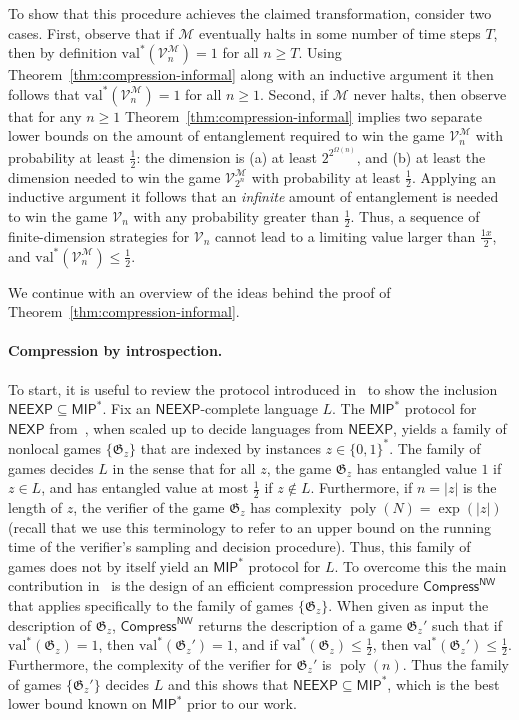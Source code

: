 \documentclass[11pt]{article}
\theoremstyle{definition}
\DeclareMathOperator{\poly}{poly}
\newcommand{\val}{\ensuremath{\mathrm{val}}}
\newcommand{\game}{\mathfrak{G}}
\newcommand{\verifier}{\mathcal{V}}
\newcommand{\class}[1]{\ensuremath{\mathsf{#1}}\xspace}
\newcommand{\NEXP}{\class{NEXP}} %
\newcommand{\MIP}{\class{MIP}} %
\newcommand{\NEEXP}{\class{NEEXP}} %
\newcommand{\machine}{\cal{M}}
\renewcommand{\cal}[1]{\mathcal{#1}}
\begin{document}
To show that this procedure achieves the claimed transformation, consider two cases. First, observe that if $\cal{M}$ eventually halts in some number of time steps $T$, then by definition $\val^*(\verifier^\machine_n) = 1$ for all $n\geq T$. Using Theorem~\ref{thm:compression-informal} along with an inductive argument it then follows that $\val^*(\verifier^\machine_n) = 1$ for all $n \geq 1$. Second, if $\cal{M}$ never halts, then observe that for any $n\geq 1$ Theorem~\ref{thm:compression-informal} implies two separate lower bounds on the amount of entanglement required to win the game $\verifier^\machine_n$ with probability at least $\frac{1}{2}$: the dimension is (a) at least $2^{2^{\Omega(n)}}$, and (b) at least the dimension needed to win the game $\verifier^\machine_{2^n}$ with probability at least $\frac{1}{2}$. Applying an inductive argument it follows that an \emph{infinite} amount of entanglement is needed to win the game $\verifier_n$ with any probability greater than $\frac{1}{2}$. Thus, a sequence of finite-dimension strategies for $\verifier_n$ cannot lead to a limiting value larger than $\frac{1x}{2}$, and $\val^*(\verifier^\machine_n) \leq \frac{1}{2}$. 

We continue with an overview of the ideas behind the proof of Theorem~\ref{thm:compression-informal}.

\newcommand{\CompressNW}{\mathsf{Compress}^{\mathsf{NW}}}
 
\paragraph{Compression by introspection.}
To start, it is useful to review the protocol introduced in~\cite{NW19} to show
the inclusion $\NEEXP \subseteq \MIP^*$.
Fix an $\NEEXP$-complete language $L$.
The $\MIP^*$ protocol for $\NEXP$ from~\cite{natarajan2018two}, when scaled up
to decide languages from $\NEEXP$, yields a family of nonlocal games $\{ \game_z
\}$ that are indexed by instances $z \in \{0,1\}^*$.
The family of games decides $L$ in the sense that for all $z$, the game
$\game_z$ has entangled value $1$ if $z \in L$, and has entangled value at most
$\frac{1}{2}$ if $z \notin L$.
Furthermore, if $n = |z|$ is the length of $z$, the verifier of the game
$\game_z$ has complexity $\poly(N)=\exp(|z|)$ (recall that we use this
terminology to refer to an upper bound on the running time of the verifier's
sampling and decision procedure).
Thus, this family of games does not by itself yield an $\MIP^*$ protocol for
$L$.
To overcome this the main contribution in~\cite{NW19} is the design of an
efficient compression procedure $\CompressNW$ that applies specifically to the
family of games $\{\game_z \}$.
When given as input the description of $\game_z$, $\CompressNW$ returns the
description of a game $\game_z'$ such that if $\val^*(\game_z) = 1$, then
$\val^*(\game_z') = 1$, and if $\val^*(\game_z) \leq \frac{1}{2}$, then
$\val^*(\game_z') \leq \frac{1}{2}$.
Furthermore, the complexity of the verifier for $\game_z'$ is $\poly(n)$.
Thus the family of games $\{ \game_z' \}$ decides $L$ and this shows that
$\NEEXP \subseteq \MIP^*$, which is the best lower bound known on $\MIP^*$
prior to our work.
  
\end{document}
